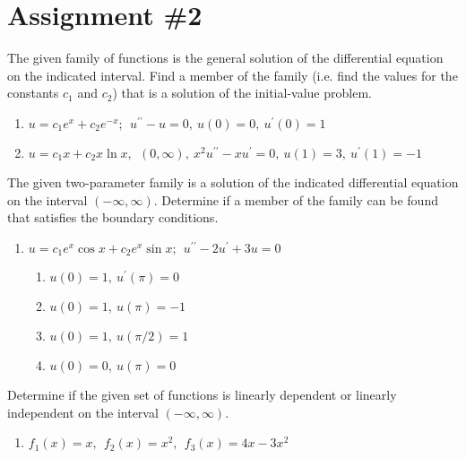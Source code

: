 \chapter{Assignment \#2}
\label{ch:ass2}
\begin{fullwidth}
The given family of functions is the general solution of the differential equation on the indicated interval.  Find a member of the family (i.e. find the values for the constants $c_1$ and $c_2$) that is a solution of the initial-value problem.

\begin{enumerate}[series=outerlist]
\item $u=c_1e^{x}+c_2e^{-x}; \ \ u^{\prime \prime}-u=0, \ u(0)=0, \ u^{\prime}(0)=1$

\vspace{1.0cm}

\item $u=c_1x + c_2x \ln{x}, \ \ (0,\infty), \ x^2u^{\prime \prime}-xu^{\prime}=0, \ u(1)=3, \ u^{\prime}(1)=-1$

\vspace{1.0cm}
\end{enumerate}

The given two-parameter family is a solution of the indicated differential equation on the interval $(-\infty,\infty)$.  Determine if a member of the family can be found that satisfies the boundary conditions.

\begin{enumerate}[resume=outerlist]
\item $u=c_1e^{x}\cos{x} + c_2e^{x}\sin{x}; \ \ u^{\prime \prime}-2u^{\prime}+3u=0$

\begin{enumerate}[series=innerlist]
\item $u(0)=1, \ u^{\prime}(\pi)=0$

\item $u(0)=1, \ u(\pi)=-1$

\item $u(0)=1, \ u(\pi/2)=1$

\item $u(0)=0, \ u(\pi)=0$
\end{enumerate}

\vspace{1.0cm}
\end{enumerate}
Determine if the given set of functions is linearly dependent or linearly independent on the interval $(-\infty,\infty)$.


\begin{enumerate}[resume=outerlist]
\item $f_1(x)=x, \ \ f_2(x)=x^2, \ \ f_3(x)=4x-3x^2$


\end{enumerate}
\end{fullwidth}
